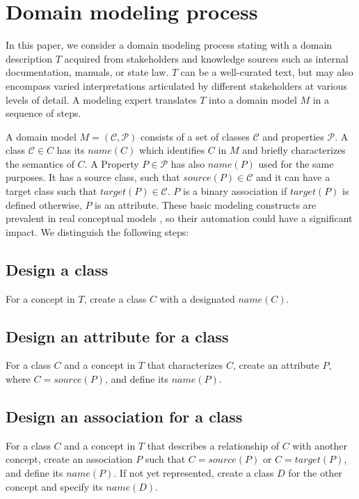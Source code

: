 \chapter{Domain modeling process}

In this paper, we consider a domain modeling process stating with a domain description $T$ acquired from stakeholders and knowledge sources such as internal documentation, manuals, or state law. $T$ can be a well-curated text, but may also encompass varied interpretations articulated by different stakeholders at various levels of detail. A modeling expert translates $T$ into a domain model $M$ in a sequence of steps.

A domain model $M = (\mathcal{C}, \mathcal{P})$ consists of a set of classes $\mathcal{C}$ and properties $\mathcal{P}$. A class $\mathcal{C} \in C$ has its $name(C)$ which identifies $C$ in $M$ and briefly characterizes the semantics of $C$. A Property $P \in \mathcal{P}$ has also $name(P)$ used for the same purposes. It has a source class, such that $source(P) \in \mathcal{C}$ and it can have a target class such that $target(P) \in \mathcal{C}$. $P$ is a binary association if $target(P)$ is defined otherwise, $P$ is an attribute. These basic modeling constructs are prevalent in real conceptual models \cite{Keet2015}, so their automation could have a significant impact. We distinguish the following steps:


\section{Design a class}
For a concept in $T$, create a class $C$ with a designated $name(C)$.

\section{Design an attribute for a class}
For a class $C$ and a concept in $T$ that characterizes $C$, create an attribute $P$, where $C = source(P)$, and define its $name(P)$.


\section{Design an association for a class}
For a class $C$ and a concept in $T$ that describes a relationship of $C$ with another concept, create an association $P$ such that $C = source(P)$ or $C = target(P)$, and define its $name(P)$. If not yet represented, create a class $D$ for the other concept and specify its $name(D)$.